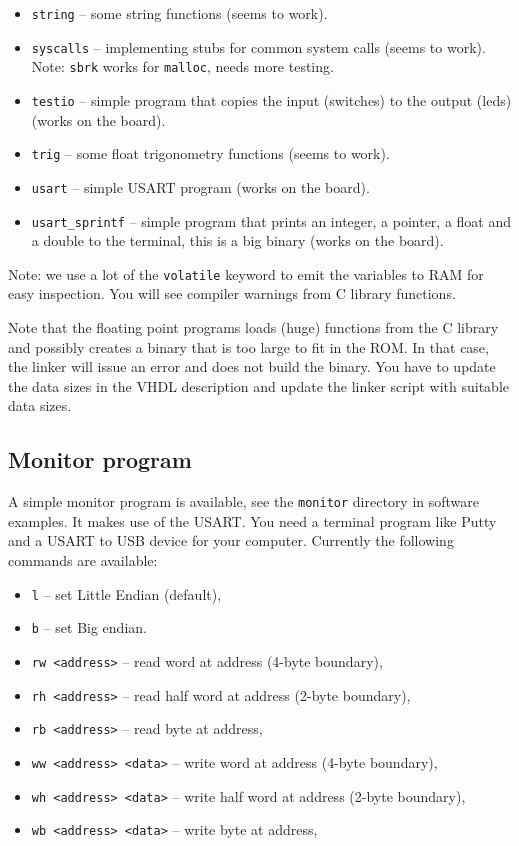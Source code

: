 \documentclass[12pt]{article}
\begin{document}
\begin{itemize}
\item \texttt{string} -- some string functions (seems to work).
\item \texttt{syscalls} -- implementing stubs for common system calls (seems to work). Note: \texttt{sbrk} works for \texttt{malloc}, needs more testing.
\item \texttt{testio} -- simple program that copies the input (switches) to the output (leds) (works on the board).
\item \texttt{trig} -- some float trigonometry functions (seems to work).
\item \texttt{usart} -- simple USART program (works on the board).
\item \texttt{usart\_sprintf} -- simple program that prints an integer, a pointer, a float and a double to the terminal, this is a big binary (works on the board).
\end{itemize} 

Note: we use a lot of the \texttt{volatile} keyword to emit the variables to RAM for easy inspection. You will see compiler warnings from C library functions.

Note that the floating point programs loads (huge) functions from the C library and possibly creates a binary that is too large to fit in the ROM. In that case, the linker will issue an error and does not build the binary. You have to update the data sizes in the VHDL description and update the linker script with suitable data sizes.

\subsection{Monitor program}
A simple monitor program is available, see the \texttt{monitor} directory in software examples. It makes use of the USART. You need a terminal program like Putty and a USART to USB device for your computer. Currently the following commands are available:

\begin{itemize}
\item \texttt{l} -- set Little Endian (default),
\item \texttt{b} -- set Big endian.
\item \texttt{rw <address>} -- read word at address (4-byte boundary),
\item \texttt{rh <address>} -- read half word at address (2-byte boundary),
\item \texttt{rb <address>} -- read byte at address,
\item \texttt{ww <address> <data>} -- write word at address (4-byte boundary),
\item \texttt{wh <address> <data>} -- write half word at address (2-byte boundary),
\item \texttt{wb <address> <data>} -- write byte at address,
\end{itemize}
\end{document}
